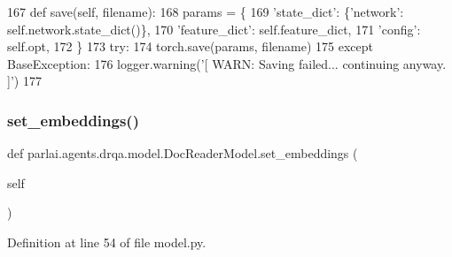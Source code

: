 \begin{DoxyCode}
167     \textcolor{keyword}{def }save(self, filename):
168         params = \{
169             \textcolor{stringliteral}{'state\_dict'}: \{\textcolor{stringliteral}{'network'}: self.network.state\_dict()\},
170             \textcolor{stringliteral}{'feature\_dict'}: self.feature\_dict,
171             \textcolor{stringliteral}{'config'}: self.opt,
172         \}
173         \textcolor{keywordflow}{try}:
174             torch.save(params, filename)
175         \textcolor{keywordflow}{except} BaseException:
176             logger.warning(\textcolor{stringliteral}{'[ WARN: Saving failed... continuing anyway. ]'})
177 
\end{DoxyCode}
\mbox{\label{classparlai_1_1agents_1_1drqa_1_1model_1_1DocReaderModel_a6d563b82872da6b70b2801f2acfcac32}} 
\subsubsection{\texorpdfstring{set\+\_\+embeddings()}{set\_embeddings()}}
{\footnotesize\ttfamily def parlai.\+agents.\+drqa.\+model.\+Doc\+Reader\+Model.\+set\+\_\+embeddings (\begin{DoxyParamCaption}\item[{}]{self }\end{DoxyParamCaption})}



Definition at line 54 of file model.\+py.


